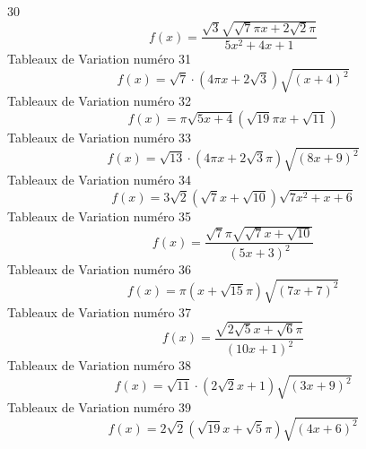 \documentclass{article}
\begin{document}
30 \[f(x) = \frac{\sqrt{3} \sqrt{\sqrt{7} \pi x + 2 \sqrt{2} \pi}}{5 x^{2} + 4 x + 1}\]Tableaux de Variation num\'ero 31 \[f(x) = \sqrt{7} \cdot \left(4 \pi x + 2 \sqrt{3}\right) \sqrt{\left(x + 4\right)^{2}}\]Tableaux de Variation num\'ero 32 \[f(x) = \pi \sqrt{5 x + 4} \left(\sqrt{19} \pi x + \sqrt{11}\right)\]Tableaux de Variation num\'ero 33 \[f(x) = \sqrt{13} \cdot \left(4 \pi x + 2 \sqrt{3} \pi\right) \sqrt{\left(8 x + 9\right)^{2}}\]Tableaux de Variation num\'ero 34 \[f(x) = 3 \sqrt{2} \left(\sqrt{7} x + \sqrt{10}\right) \sqrt{7 x^{2} + x + 6}\]Tableaux de Variation num\'ero 35 \[f(x) = \frac{\sqrt{7} \pi \sqrt{\sqrt{7} x + \sqrt{10}}}{\left(5 x + 3\right)^{2}}\]Tableaux de Variation num\'ero 36 \[f(x) = \pi \left(x + \sqrt{15} \pi\right) \sqrt{\left(7 x + 7\right)^{2}}\]Tableaux de Variation num\'ero 37 \[f(x) = \frac{\sqrt{2 \sqrt{5} x + \sqrt{6} \pi}}{\left(10 x + 1\right)^{2}}\]Tableaux de Variation num\'ero 38 \[f(x) = \sqrt{11} \cdot \left(2 \sqrt{2} x + 1\right) \sqrt{\left(3 x + 9\right)^{2}}\]Tableaux de Variation num\'ero 39 \[f(x) = 2 \sqrt{2} \left(\sqrt{19} x + \sqrt{5} \pi\right) \sqrt{\left(4 x + 6\right)^{2}}\]
\end{document}
